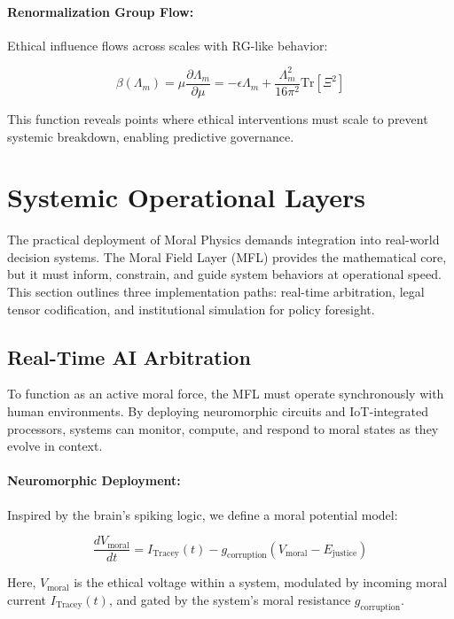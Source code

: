 \documentclass[12]{amsart}
\theoremstyle{plain}
\begin{document}
\paragraph{Renormalization Group Flow:}

Ethical influence flows across scales with RG-like behavior:

\[
\beta(\Lambda_m) = \mu \frac{\partial \Lambda_m}{\partial \mu} = -\epsilon \Lambda_m + \frac{\Lambda_m^2}{16\pi^2} \text{Tr}[\Xi^2]
\]

This function reveals points where ethical interventions must scale to prevent systemic breakdown, enabling predictive governance.

\section{Systemic Operational Layers}

The practical deployment of Moral Physics demands integration into real-world decision systems. The Moral Field Layer (MFL) provides the mathematical core, but it must inform, constrain, and guide system behaviors at operational speed. This section outlines three implementation paths: real-time arbitration, legal tensor codification, and institutional simulation for policy foresight.

\subsection{Real-Time AI Arbitration}

To function as an active moral force, the MFL must operate synchronously with human environments. By deploying neuromorphic circuits and IoT-integrated processors, systems can monitor, compute, and respond to moral states as they evolve in context.

\paragraph{Neuromorphic Deployment:}

Inspired by the brain’s spiking logic, we define a moral potential model:

\[
\frac{dV_{\text{moral}}}{dt} = I_{\text{Tracey}}(t) - g_{\text{corruption}}(V_{\text{moral}} - E_{\text{justice}})
\]

Here, \(V_{\text{moral}}\) is the ethical voltage within a system, modulated by incoming moral current \(I_{\text{Tracey}}(t)\), and gated by the system's moral resistance \(g_{\text{corruption}}\).
\end{document}
